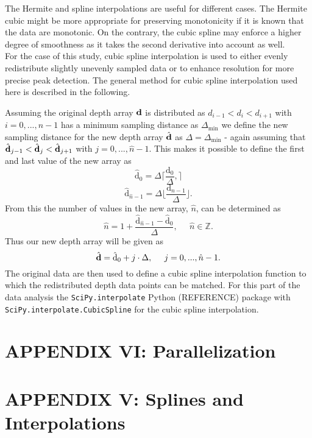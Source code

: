 \documentclass[../../CompleteThesis/Complete_1stDraft.tex]{subfiles}
\begin{document}
	The Hermite and spline interpolations are useful for different cases. The Hermite cubic might be more appropriate for preserving monotonicity if it is known that the data are monotonic. On the contrary, the cubic spline may enforce a higher degree of smoothness as it takes the second derivative into account as well.\\
	For the case of this study, cubic spline interpolation is used to either evenly redistribute slightly unevenly sampled data or to enhance resolution for more precise peak detection. The general method for cubic spline interpolation used here is described in the following.
	
	Assuming the original depth array $\text{\textbf{d}}$ is distributed as $d_{i-1} < d_i < d_{i+1}$ with $i = 0, ..., n-1$ has a minimum sampling distance as $\Delta_{\text{min}}$ we define the new sampling distance for the new depth array $\hat{\text{\textbf{d}}}$ as $\Delta =\Delta_{\text{min}}$ - again assuming that $\hat{\text{\textbf{d}}}_{j-1} < \hat{\text{\textbf{d}}}_j < \hat{\text{\textbf{d}}}_{j+1}$ with $j = 0, ..., \hat{n}-1$. This makes it possible to define the first and last value of the new array as
	\begin{equation}
		\hat{\text{d}}_0 = \Delta \lceil \frac{\text{d}_0}{\Delta}, \rceil 
		\label{Eq:InterpDepthMin}
	\end{equation}
	\begin{equation}
		\hat{\text{d}}_{\hat{n}-1} = \Delta \lfloor \frac{\text{d}_{n-1}}{\Delta} \rfloor.
		\label{Eq:InterpDepthMax}
	\end{equation}
	From this the number of values in the new array, $\hat{n}$, can be determined as
	\begin{equation}
		\hat{n} = 1 +  \frac{\hat{\text{d}}_{\hat{n}-1} - \hat{\text{d}}_0}{\Delta},\;\;\;\;\; \hat{n} \in\mathbb{Z}.
	\end{equation}
	Thus our new depth array will be given as
	\begin{equation}
		\hat{\text{\textbf{d}}} = \hat{\text{d}}_0 + j\cdot\Delta,\;\;\;\;\; j = 0, ..., \hat{n}-1.
	\end{equation}
	The original data are then used to define a cubic spline interpolation function to which the redistributed depth data points can be matched. For this part of the data analysis the \lstinline[columns=fixed]|SciPy.interpolate| Python (REFERENCE) package with \lstinline[columns=fixed]|SciPy.interpolate.CubicSpline| for the cubic spline interpolation.
	
	
	\newpage
	\section[Appendix VI]{APPENDIX VI: Parallelization}	
	\label{AppVI:Parallelization}
		
		
	\newpage
\section[Appendix V]{APPENDIX V: Splines and Interpolations}
\label{AppV:SplinesAndInterpolation}
\end{document}
